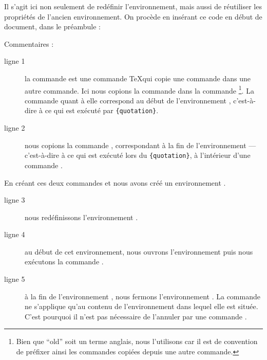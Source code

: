 Il s'agit ici non seulement de redéfinir l'environnement, mais aussi de réutiliser les propriétés de l'ancien environnement. On procède en insérant ce code en début de document, dans le préambule :

\begin{latexcode}
\let\oldquotation\quotation
\let\endoldquotation\endquotation
\renewenvironment{quotation}
    {\begin{oldquotation}\singlespace}
        {\end{oldquotation}}
\end{latexcode}

Commentaires :

\begin{description}
\item[ligne 1]la commande  est une commande \TeX qui copie une commande dans une autre commande. Ici nous copions la commande  dans la commande \footnote{Bien que \enquote{old} soit un terme anglais, nous l'utilisons car il est de convention de préfixer ainsi les commandes copiées depuis une autre commande.}. La commande  quant à elle correspond au début de l'environnement , c'est-à-dire à ce qui est exécuté par \verb|{quotation}|.
\item[ligne 2]nous copions la commande , correspondant à la fin de l'environnement   --- c'est-à-dire à ce qui est exécuté lors du \verb|{quotation}|, à l'intérieur d'une commande .
\end{description}

En créant ces deux commandes  et  nous avons créé un environnement .

\begin{description}
\item[ligne 3]nous redéfinissons l'environnement .
\item[ligne 4]au début de cet environnement, nous ouvrons l'environnement  puis nous exécutons la commande .
\item[ligne 5]à la fin de l'environnement , nous fermons l'environnement . La commande  ne s'applique qu'au contenu de l'environnement dans lequel elle est située. C'est pourquoi il n'est pas nécessaire de l'annuler par une commande .
\end{description}


